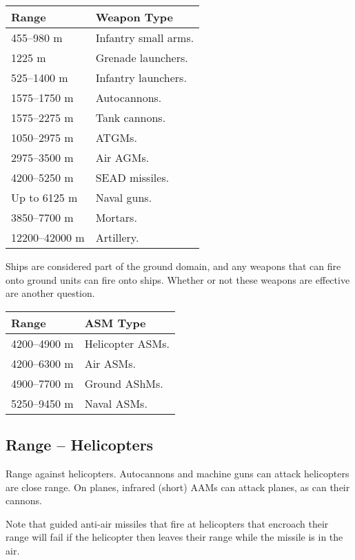 \documentclass{article}
\begin{document}
\begin{center}
    \begin{tabular}{ | l | l | }
    \hline
    Range & Weapon Type \\ \hline
    455--980 m & Infantry small arms. \\
    1225 m & Grenade launchers.\\
    525--1400 m & Infantry launchers. \\
    1575--1750 m & Autocannons. \\    
    1575--2275 m & Tank cannons. \\    
    1050--2975 m & ATGMs. \\
    2975--3500 m & Air AGMs. \\
    4200--5250 m & SEAD missiles. \\
    Up to 6125 m & Naval guns. \\
    3850--7700 m & Mortars. \\
    12200--42000 m & Artillery. \\ \hline
    \end{tabular}
\end{center}

Ships are considered part of the ground domain, and any weapons that can fire
onto ground units can fire onto ships. Whether or not these weapons are
effective are another question.

\begin{center}
    \begin{tabular}{ | l | l | }
    \hline
    Range & ASM Type \\ \hline
    4200--4900 m & Helicopter ASMs. \\
    4200--6300 m & Air ASMs. \\
    4900--7700 m & Ground AShMs. \\
    5250--9450 m & Naval ASMs. \\ \hline
    \end{tabular}
\end{center}

\subsection{Range -- Helicopters}

Range against helicopters. Autocannons and machine guns can attack helicopters
are close range. On planes, infrared (short) AAMs can attack planes, as can
their cannons.

Note that guided anti-air missiles that fire at helicopters that encroach their
range will fail if the helicopter then leaves their range while the missile is
in the air.
\end{document}
